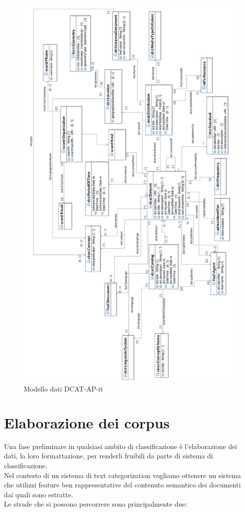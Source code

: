 \documentclass{article}
\theoremstyle{plain}
\theoremstyle{definition}
\begin{document}
\begin{figure}[htbp]
\begin{center}
\includegraphics[scale=0.45]{img/DCAT-AP_IT_UML.png}
\caption{Modello dati DCAT-AP-it}
\end{center}
\end{figure}

\newpage
\section{Elaborazione dei corpus}
Una fase preliminare in qualsiasi ambito di classificazione è l'elaborazione dei dati, la loro formattazione, per renderli fruibili da parte di sistema di classificazione.
\\Nel contesto di un sistema di text categorization vogliamo ottenere un sistema che utilizzi feature ben rappresentative del contenuto semantico dei documenti dai quali sono estratte.
\\
Le strade che si possono percorrere sono principalmente due:
\end{document}
